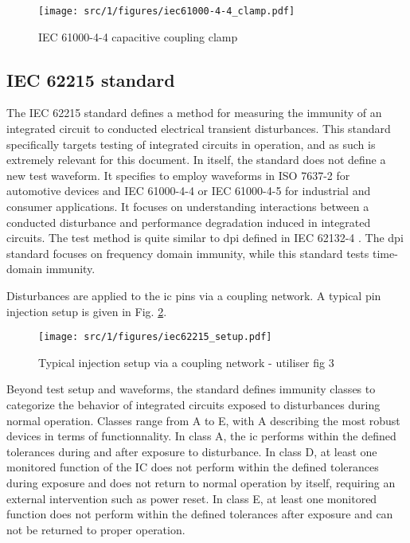\begin{figure}[!h]
  \centering
  \texttt{[image: src/1/figures/iec61000-4-4\_clamp.pdf]}
  \caption{IEC 61000-4-4 capacitive coupling clamp}
  \label{fig:iec_4_4_clamp}
\end{figure}

\subsection{IEC 62215 standard}

The IEC 62215 standard \cite{iec62215} defines a method for measuring the immunity of an integrated circuit to conducted electrical transient disturbances.
This standard specifically targets testing of integrated circuits in operation, and as such is extremely relevant for this document.
In itself, the standard does not define a new test waveform.
It specifies to employ waveforms in ISO 7637-2 \cite{iso7637-2} for automotive devices and IEC 61000-4-4 \cite{iec61000-4-4} or IEC 61000-4-5 for industrial and consumer applications.
It focuses on understanding interactions between a conducted disturbance and performance degradation induced in integrated circuits.
The test method is quite similar to \gls{dpi} defined in IEC 62132-4 \cite{iec62132-4}.
The \gls{dpi} standard focuses on frequency domain immunity, while this standard tests time-domain immunity.

Disturbances are applied to the \gls{ic} pins via a coupling network.
A typical pin injection setup is given in Fig. \ref{fig:iec62215_setup}.

\begin{figure}[!h]
  \centering
  \texttt{[image: src/1/figures/iec62215\_setup.pdf]}
  \caption{Typical injection setup via a coupling network - utiliser fig 3}
  \label{fig:iec62215_setup}
\end{figure}

Beyond test setup and waveforms, the standard defines immunity classes to categorize the behavior of integrated circuits exposed to disturbances during normal operation.
Classes range from A to E, with A describing the most robust devices in terms of functionnality.
In class A, the \gls{ic} performs within the defined tolerances during and after exposure to disturbance.
In class D, at least one monitored function of the IC does not perform within the defined tolerances during exposure and does not return to normal operation by itself, requiring an external intervention such as power reset.
In class E, at least one monitored function does not perform within the defined tolerances after exposure and can not be returned to proper operation.

